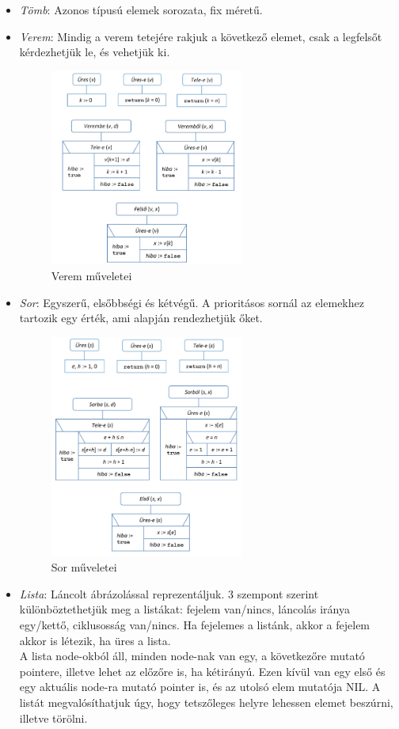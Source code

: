 \documentclass[12pt,margin=0px]{article}
\begin{document}
	\begin{itemize}
		\item \textit{Tömb}: Azonos típusú elemek sorozata, fix méretű.
		\item \textit{Verem}: Mindig a verem tetejére rakjuk a következő elemet, csak a legfelsőt kérdezhetjük le, és vehetjük ki.
		\begin{figure}[H]
			\centering
			\includegraphics[width=0.6\textwidth]{img/stack_operations.png}
			\caption{Verem műveletei}
		\end{figure}
		\item \textit{Sor}: Egyszerű, elsőbbségi és kétvégű. A prioritásos sornál az elemekhez tartozik egy érték, ami alapján rendezhetjük  őket.
		\begin{figure}[H]
			\centering
			\includegraphics[width=0.6\textwidth]{img/queue_operations.png}
			\caption{Sor műveletei}
		\end{figure}
        \item \textit{Lista}: Láncolt ábrázolással reprezentáljuk. 3 szempont szerint különböztethetjük meg a listákat: fejelem van/nincs, láncolás iránya egy/kettő, ciklusosság van/nincs. Ha fejelemes a listánk, akkor a fejelem akkor is létezik, ha üres a lista.\\
        A lista node-okból áll, minden node-nak van egy, a következőre mutató pointere, illetve lehet az előzőre is, ha kétirányú. Ezen kívül van egy első és egy aktuális node-ra mutató pointer is, és az utolsó elem mutatója NIL. A listát megvalósíthatjuk úgy, hogy tetszőleges helyre lehessen elemet beszúrni, illetve törölni.


\end{itemize}
\end{document}
